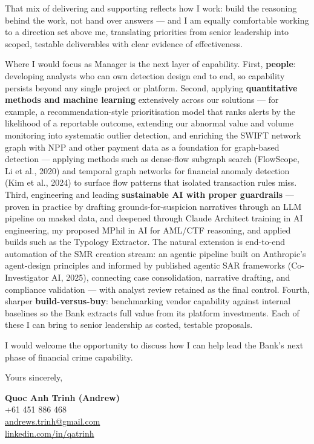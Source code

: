 \documentclass[11pt, a4paper]{article}
\begin{document}
That mix of delivering and supporting reflects how I work: build the reasoning behind the work, not hand over answers --- and I am equally comfortable working to a direction set above me, translating priorities from senior leadership into scoped, testable deliverables with clear evidence of effectiveness.

Where I would focus as Manager is the next layer of capability. First, \textbf{people}: developing analysts who can own detection design end to end, so capability persists beyond any single project or platform. Second, applying \textbf{quantitative methods and machine learning} extensively across our solutions --- for example, a recommendation-style prioritisation model that ranks alerts by the likelihood of a reportable outcome, extending our abnormal value and volume monitoring into systematic outlier detection, and enriching the SWIFT network graph with NPP and other payment data as a foundation for graph-based detection --- applying methods such as dense-flow subgraph search (FlowScope, Li et al., 2020) and temporal graph networks for financial anomaly detection (Kim et al., 2024) to surface flow patterns that isolated transaction rules miss. Third, engineering and leading \textbf{sustainable AI with proper guardrails} --- proven in practice by drafting grounds-for-suspicion narratives through an LLM pipeline on masked data, and deepened through Claude Architect training in AI engineering, my proposed MPhil in AI for AML/CTF reasoning, and applied builds such as the Typology Extractor. The natural extension is end-to-end automation of the SMR creation stream: an agentic pipeline built on Anthropic's agent-design principles and informed by published agentic SAR frameworks (Co-Investigator AI, 2025), connecting case consolidation, narrative drafting, and compliance validation --- with analyst review retained as the final control. Fourth, sharper \textbf{build-versus-buy}: benchmarking vendor capability against internal baselines so the Bank extracts full value from its platform investments. Each of these I can bring to senior leadership as costed, testable proposals.

I would welcome the opportunity to discuss how I can help lead the Bank's next phase of financial crime capability.

\vspace{14pt}

Yours sincerely,

\vspace{24pt}

\textbf{Quoc Anh Trinh (Andrew)}\\
+61 451 886 468\\
\href{mailto:andrews.trinh@gmail.com}{andrews.trinh@gmail.com}\\
\href{https://www.linkedin.com/in/qatrinh}{linkedin.com/in/qatrinh}
\end{document}
